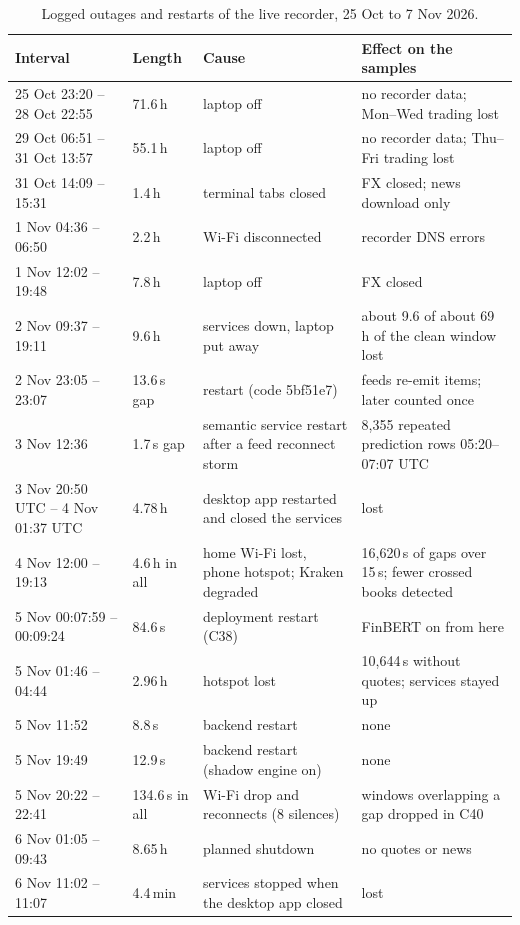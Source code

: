 \documentclass[conference]{IEEEtran}
\begin{document}
\begin{table}[t]\centering\footnotesize
\caption{Logged outages and restarts of the live recorder, 25 Oct to 7 Nov 2026.}\label{tab:downtime}
\begin{tabular}{@{}p{}p{}p{}p{}@{}}
\toprule
Interval & Length & Cause & Effect on the samples\\
\midrule
25 Oct 23:20 -- 28 Oct 22:55 & 71.6\,h & laptop off & no recorder data; Mon--Wed trading lost\\
29 Oct 06:51 -- 31 Oct 13:57 & 55.1\,h & laptop off & no recorder data; Thu--Fri trading lost\\
31 Oct 14:09 -- 15:31 & 1.4\,h & terminal tabs closed & FX closed; news download only\\
1 Nov 04:36 -- 06:50 & 2.2\,h & Wi-Fi disconnected & recorder DNS errors\\
1 Nov 12:02 -- 19:48 & 7.8\,h & laptop off & FX closed\\
2 Nov 09:37 -- 19:11 & 9.6\,h & services down, laptop put away & about 9.6 of about 69 h of the clean window lost\\
2 Nov 23:05 -- 23:07 & 13.6\,s gap & restart (code 5bf51e7) & feeds re-emit items; later counted once\\
3 Nov 12:36 & 1.7\,s gap & semantic service restart after a feed reconnect storm & 8,355 repeated prediction rows 05:20--07:07 UTC\\
3 Nov 20:50 UTC -- 4 Nov 01:37 UTC & 4.78\,h & desktop app restarted and closed the services & lost\\
4 Nov 12:00 -- 19:13 & 4.6\,h in all & home Wi-Fi lost, phone hotspot; Kraken degraded & 16,620\,s of gaps over 15\,s; fewer crossed books detected\\
5 Nov 00:07:59 -- 00:09:24 & 84.6\,s & deployment restart (C38) & FinBERT on from here\\
5 Nov 01:46 -- 04:44 & 2.96\,h & hotspot lost & 10,644\,s without quotes; services stayed up\\
5 Nov 11:52 & 8.8\,s & backend restart & none\\
5 Nov 19:49 & 12.9\,s & backend restart (shadow engine on) & none\\
5 Nov 20:22 -- 22:41 & 134.6\,s in all & Wi-Fi drop and reconnects (8 silences) & windows overlapping a gap dropped in C40\\
6 Nov 01:05 -- 09:43 & 8.65\,h & planned shutdown & no quotes or news\\
6 Nov 11:02 -- 11:07 & 4.4\,min & services stopped when the desktop app closed & lost\\

\end{tabular}
\end{table}
\end{document}
